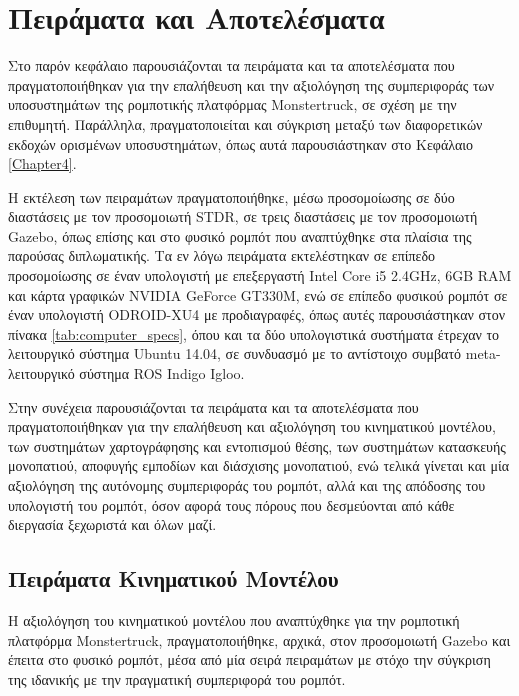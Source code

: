 
\chapter{Πειράματα και Αποτελέσματα} \label{Chapter5}
Στο παρόν κεφάλαιο παρουσιάζονται τα πειράματα και τα αποτελέσματα που πραγματοποιήθηκαν για την επαλήθευση και την αξιολόγηση της συμπεριφοράς των υποσυστημάτων της ρομποτικής πλατφόρμας Monstertruck, σε σχέση με την επιθυμητή. Παράλληλα, πραγματοποιείται και σύγκριση μεταξύ των διαφορετικών εκδοχών ορισμένων υποσυστημάτων, όπως αυτά παρουσιάστηκαν στο Κεφάλαιο \ref{Chapter4}. 

\bigskip
Η εκτέλεση των πειραμάτων πραγματοποιήθηκε, μέσω προσομοίωσης σε δύο διαστάσεις με τον προσομοιωτή STDR, σε τρεις διαστάσεις με τον προσομοιωτή Gazebo, όπως επίσης και στο φυσικό ρομπότ που αναπτύχθηκε στα πλαίσια της παρούσας διπλωματικής. Τα εν λόγω πειράματα εκτελέστηκαν σε επίπεδο προσομοίωσης σε έναν υπολογιστή με επεξεργαστή Intel Core i5 2.4GHz, 6GB RAM και κάρτα γραφικών NVIDIA GeForce GT330M, ενώ σε επίπεδο φυσικού ρομπότ σε έναν υπολογιστή ODROID-XU4 με προδιαγραφές, όπως αυτές παρουσιάστηκαν στον πίνακα \ref{tab:computer_specs}, όπου και τα δύο υπολογιστικά συστήματα έτρεχαν το λειτουργικό σύστημα Ubuntu 14.04, σε συνδυασμό με το αντίστοιχο συμβατό meta-λειτουργικό σύστημα ROS Indigo Igloo.

\bigskip
Στην συνέχεια παρουσιάζονται τα πειράματα και τα αποτελέσματα που πραγματοποιήθηκαν για την επαλήθευση και αξιολόγηση του κινηματικού μοντέλου, των συστημάτων χαρτογράφησης και εντοπισμού θέσης, των συστημάτων κατασκευής μονοπατιού, αποφυγής εμποδίων και διάσχισης μονοπατιού, ενώ τελικά γίνεται και μία αξιολόγηση της αυτόνομης συμπεριφοράς του ρομπότ, αλλά και της απόδοσης του υπολογιστή του ρομπότ, όσον αφορά τους πόρους που δεσμεύονται από κάθε διεργασία ξεχωριστά και όλων μαζί.

\section{Πειράματα Κινηματικού Μοντέλου} \label{sec:kinematics_experiments}  %
Η αξιολόγηση του κινηματικού μοντέλου που αναπτύχθηκε για την ρομποτική πλατφόρμα Monstertruck, πραγματοποιήθηκε, αρχικά, στον προσομοιωτή Gazebo και έπειτα στο φυσικό ρομπότ, μέσα από μία σειρά πειραμάτων με στόχο την σύγκριση της ιδανικής με την πραγματική συμπεριφορά του ρομπότ.  

